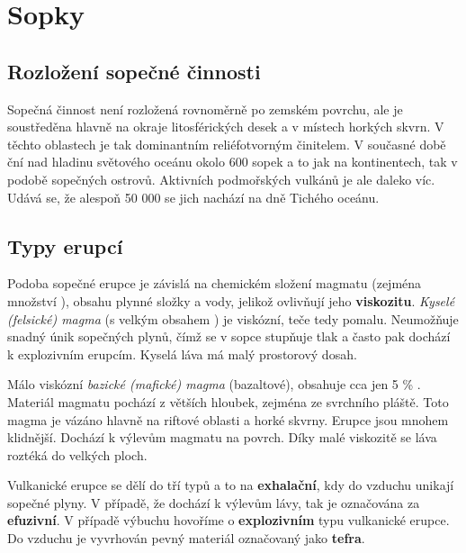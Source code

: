 \section{Sopky}
\subsection{Rozložení sopečné činnosti}
Sopečná činnost není rozložená rovnoměrně po zemském povrchu, ale je soustředěna hlavně na okraje litosférických desek a v místech horkých skvrn. V těchto oblastech je tak dominantním reliéfotvorným činitelem. V současné době ční nad hladinu světového oceánu okolo 600 sopek a to jak na kontinentech, tak v podobě sopečných ostrovů. Aktivních podmořských vulkánů je ale daleko víc. Udává se, že alespoň 50 000 se jich nachází na dně Tichého oceánu.

\subsection{Typy erupcí}
Podoba sopečné erupce je závislá na chemickém složení magmatu (zejména množství ), obsahu plynné složky a vody, jelikož ovlivňují jeho \textbf{viskozitu}. \emph{Kyselé (felsické) magma} (s velkým obsahem ) je viskózní, teče tedy pomalu. Neumožňuje snadný únik sopečných plynů, čímž se v sopce stupňuje tlak a často pak dochází k explozivním erupcím. Kyselá láva má malý prostorový dosah.

Málo viskózní \emph{bazické (mafické) magma} (bazaltové), obsahuje cca jen 5 \% . Materiál magmatu pochází z větších hloubek, zejména ze svrchního pláště. Toto magma je vázáno hlavně na riftové oblasti a horké skvrny. Erupce jsou mnohem klidnější. Dochází k výlevům magmatu na povrch. Díky malé viskozitě se láva roztéká do velkých ploch.

Vulkanické erupce se dělí do tří typů a to na \textbf{exhalační}, kdy do vzduchu unikají sopečné plyny. V případě, že dochází k výlevům lávy, tak je označována za \textbf{efuzivní}. V případě výbuchu hovoříme o \textbf{explozivním} typu vulkanické erupce. Do vzduchu je vyvrhován pevný materiál označovaný jako \textbf{tefra}.

